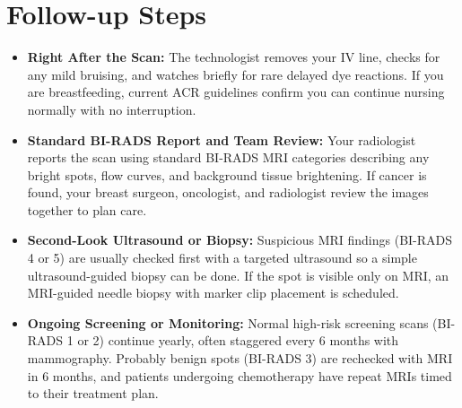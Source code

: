 \section{Follow-up Steps}
\begin{itemize}
\item \textbf{Right After the Scan:} The technologist removes your IV line, checks for any mild bruising, and watches briefly for rare delayed dye reactions. If you are breastfeeding, current ACR guidelines confirm you can continue nursing normally with no interruption.
\item \textbf{Standard BI-RADS Report and Team Review:} Your radiologist reports the scan using standard BI-RADS MRI categories describing any bright spots, flow curves, and background tissue brightening. If cancer is found, your breast surgeon, oncologist, and radiologist review the images together to plan care.
\item \textbf{Second-Look Ultrasound or Biopsy:} Suspicious MRI findings (BI-RADS 4 or 5) are usually checked first with a targeted ultrasound so a simple ultrasound-guided biopsy can be done. If the spot is visible only on MRI, an MRI-guided needle biopsy with marker clip placement is scheduled.
\item \textbf{Ongoing Screening or Monitoring:} Normal high-risk screening scans (BI-RADS 1 or 2) continue yearly, often staggered every 6 months with mammography. Probably benign spots (BI-RADS 3) are rechecked with MRI in 6 months, and patients undergoing chemotherapy have repeat MRIs timed to their treatment plan.
\end{itemize}

